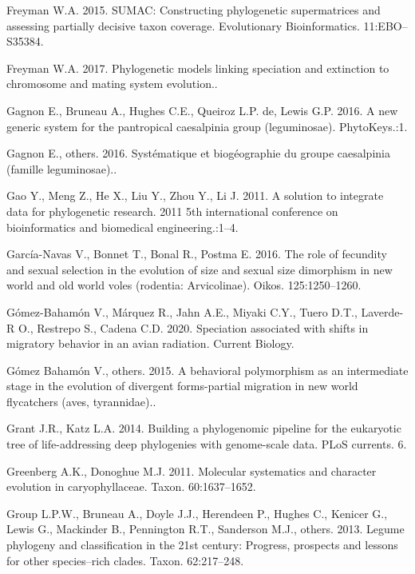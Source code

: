 \documentclass[]{article}
\begin{document}
\leavevmode\hypertarget{ref-freyman2015sumac}{}%
Freyman W.A. 2015. SUMAC: Constructing phylogenetic supermatrices and assessing partially decisive taxon coverage. Evolutionary Bioinformatics. 11:EBO--S35384.

\leavevmode\hypertarget{ref-freyman2017phylogenetic}{}%
Freyman W.A. 2017. Phylogenetic models linking speciation and extinction to chromosome and mating system evolution..

\leavevmode\hypertarget{ref-gagnon2016new}{}%
Gagnon E., Bruneau A., Hughes C.E., Queiroz L.P. de, Lewis G.P. 2016. A new generic system for the pantropical caesalpinia group (leguminosae). PhytoKeys.:1.

\leavevmode\hypertarget{ref-gagnon2016systematique}{}%
Gagnon E., others. 2016. Systématique et biogéographie du groupe caesalpinia (famille leguminosae)..

\leavevmode\hypertarget{ref-gao2011solution}{}%
Gao Y., Meng Z., He X., Liu Y., Zhou Y., Li J. 2011. A solution to integrate data for phylogenetic research. 2011 5th international conference on bioinformatics and biomedical engineering.:1--4.

\leavevmode\hypertarget{ref-garcia2016role}{}%
García-Navas V., Bonnet T., Bonal R., Postma E. 2016. The role of fecundity and sexual selection in the evolution of size and sexual size dimorphism in new world and old world voles (rodentia: Arvicolinae). Oikos. 125:1250--1260.

\leavevmode\hypertarget{ref-gomez2020speciation}{}%
Gómez-Bahamón V., Márquez R., Jahn A.E., Miyaki C.Y., Tuero D.T., Laverde-R O., Restrepo S., Cadena C.D. 2020. Speciation associated with shifts in migratory behavior in an avian radiation. Current Biology.

\leavevmode\hypertarget{ref-gomez2015behavioral}{}%
Gómez Bahamón V., others. 2015. A behavioral polymorphism as an intermediate stage in the evolution of divergent forms-partial migration in new world flycatchers (aves, tyrannidae)..

\leavevmode\hypertarget{ref-grant2014building}{}%
Grant J.R., Katz L.A. 2014. Building a phylogenomic pipeline for the eukaryotic tree of life-addressing deep phylogenies with genome-scale data. PLoS currents. 6.

\leavevmode\hypertarget{ref-greenberg2011caryophyllaceae}{}%
Greenberg A.K., Donoghue M.J. 2011. Molecular systematics and character evolution in caryophyllaceae. Taxon. 60:1637--1652.

\leavevmode\hypertarget{ref-legume2013legume}{}%
Group L.P.W., Bruneau A., Doyle J.J., Herendeen P., Hughes C., Kenicer G., Lewis G., Mackinder B., Pennington R.T., Sanderson M.J., others. 2013. Legume phylogeny and classification in the 21st century: Progress, prospects and lessons for other species--rich clades. Taxon. 62:217--248.
\end{document}
